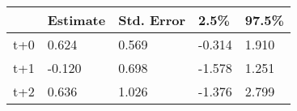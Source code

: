 \begin{tabular}{lllll}
  \toprule
  & Estimate & Std. Error & 2.5\% & 97.5\% \\ 
  \midrule
t+0 & 0.624 & 0.569 & -0.314 & 1.910 \\ 
  t+1 & -0.120 & 0.698 & -1.578 & 1.251 \\ 
  t+2 & 0.636 & 1.026 & -1.376 & 2.799 \\ 
   \bottomrule
\end{tabular}
